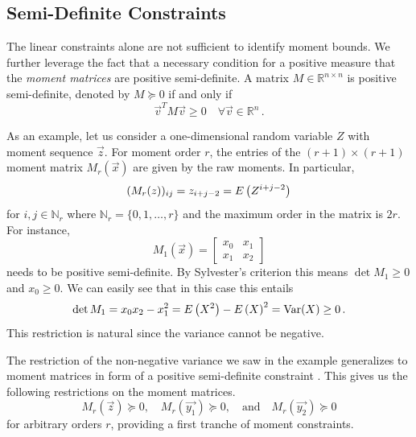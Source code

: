 \subsection{Semi-Definite Constraints}
The linear constraints alone are not sufficient to identify moment bounds.
We further leverage the fact that a necessary condition for a positive measure that the \emph{moment matrices}
are positive semi-definite.
A matrix $M\in\mathbb{R}^{n\times n}$ is positive semi-definite, denoted by  $M\succeq 0$ if and only if
\[
	{\vec v}^T M{\vec v} \geq 0\quad \forall \vec v\in\mathbb{R}^n\,.
\]
\begin{example}
As an example, let us consider a one-dimensional random variable $Z$
with moment sequence $\vec z$.
For  moment order $r$,
the entries of the $(r+1)\times (r+1)$ moment matrix $M_r(\vec x)$ are given by
the raw moments.
In particular, 
\[ 
	(M_r({z}))_{ij}=z_{i+j-2}={E}\left(Z^{i+j-2}\right)
\]
for
$i,j\in\mathbb{N}_r$ where $\mathbb{N}_r=\{0,1,\dots,r\}$ and the maximum order in the matrix is $2r$.
For instance,
\begin{equation}
\label{eq:m1_dim}
    M_1(\vec x) =
    \begin{bmatrix}
    x_0 & x_1 \\
    x_1 & x_2
    \end{bmatrix}
\end{equation}
needs to be positive semi-definite. By Sylvester's criterion this means $\det
M_1\geq 0$ and $x_0\geq 0$.
We can easily see that in this case this entails
	\[
\det M_1=x_0x_2 - x_1^2={E}\left(X^2\right)-{E}\left(X\right)^2
=\mathrm{Var}({X})
\geq 0\,.
\]
This restriction is natural since the variance cannot be negative.
\end{example}
The restriction of the non-negative variance we saw in the example generalizes
to moment matrices in form of a positive semi-definite constraint \cite{parrilo2003semidefinite}.
This gives us the following restrictions on the moment matrices.
\begin{equation}\label{eq:sd_constraints}
M_r(\vec{z})\succeq 0, \quad M_r(\vec{y_1})\succeq 0,\quad\text{and}\quad M_r(\vec{y_2})\succeq 0
\end{equation}
for arbitrary orders $r$, providing a first tranche of moment constraints.

